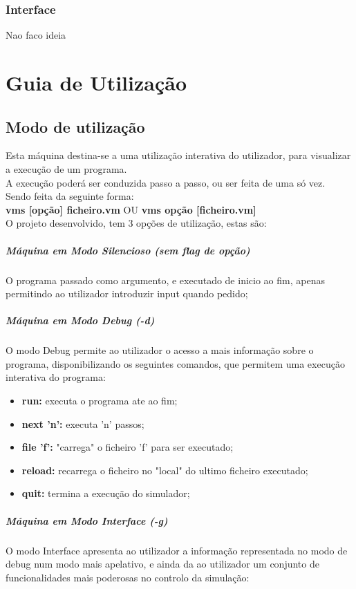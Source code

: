 \documentclass{report}
\begin{document}
\subsection{Interface}
\quad Nao faco ideia

\chapter{Guia de Utilização}
\section{Modo de utilização}
\quad Esta máquina destina-se a uma utilização interativa do utilizador, para visualizar a execução de um programa.\\
A execução poderá ser conduzida passo a passo, ou ser feita de uma só vez.\\
Sendo feita da seguinte forma:\\

\quad \textbf{vms [opção] ficheiro.vm} OU \textbf{vms opção [ficheiro.vm]}\\

O projeto desenvolvido, tem 3 opções de utilização, estas são:
\paragraph{\quad Máquina em Modo Silencioso (sem flag de opção)}
	O programa passado como argumento, e executado de inicio ao fim, apenas permitindo ao utilizador introduzir input quando pedido;
\paragraph{\quad Máquina em Modo Debug (-d)}
	O modo Debug permite ao utilizador o acesso a mais informação sobre o programa, disponibilizando
  os seguintes comandos, que permitem uma execução interativa do programa:
\begin{itemize}
	\item \textbf{run:} executa o programa ate ao fim;
	\item \textbf{next 'n':} executa 'n' passos;
	\item \textbf{file 'f':} "carrega" o ficheiro 'f' para ser executado;
	\item \textbf{reload:} recarrega o ficheiro no "local" do ultimo ficheiro executado;
	\item \textbf{quit:} termina a execução do simulador;
\end{itemize}
\paragraph{\quad Máquina em Modo Interface (-g)}
  O modo Interface apresenta ao utilizador a informação representada no modo de debug num modo mais apelativo,
	e ainda da ao utilizador um conjunto de funcionalidades mais poderosas no controlo da simulação:
\end{document}

